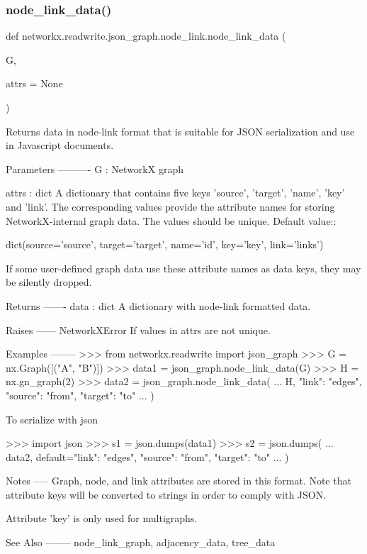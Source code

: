 \subsubsection{\texorpdfstring{node\+\_\+link\+\_\+data()}{node\_link\_data()}}
{\footnotesize\ttfamily def networkx.\+readwrite.\+json\+\_\+graph.\+node\+\_\+link.\+node\+\_\+link\+\_\+data (\begin{DoxyParamCaption}\item[{}]{G,  }\item[{}]{attrs = {\ttfamily None} }\end{DoxyParamCaption})}

\begin{DoxyVerb}Returns data in node-link format that is suitable for JSON serialization
and use in Javascript documents.

Parameters
----------
G : NetworkX graph

attrs : dict
    A dictionary that contains five keys 'source', 'target', 'name',
    'key' and 'link'.  The corresponding values provide the attribute
    names for storing NetworkX-internal graph data.  The values should
    be unique.  Default value::

        dict(source='source', target='target', name='id',
             key='key', link='links')

    If some user-defined graph data use these attribute names as data keys,
    they may be silently dropped.

Returns
-------
data : dict
   A dictionary with node-link formatted data.

Raises
------
NetworkXError
    If values in attrs are not unique.

Examples
--------
>>> from networkx.readwrite import json_graph
>>> G = nx.Graph([("A", "B")])
>>> data1 = json_graph.node_link_data(G)
>>> H = nx.gn_graph(2)
>>> data2 = json_graph.node_link_data(
...     H, {"link": "edges", "source": "from", "target": "to"}
... )

To serialize with json

>>> import json
>>> s1 = json.dumps(data1)
>>> s2 = json.dumps(
...     data2, default={"link": "edges", "source": "from", "target": "to"}
... )

Notes
-----
Graph, node, and link attributes are stored in this format.  Note that
attribute keys will be converted to strings in order to comply with JSON.

Attribute 'key' is only used for multigraphs.

See Also
--------
node_link_graph, adjacency_data, tree_data
\end{DoxyVerb}
 \mbox{\label{namespacenetworkx_1_1readwrite_1_1json__graph_1_1node__link_a3afa2ab08fa08b84be93a597b78a306b}} 
